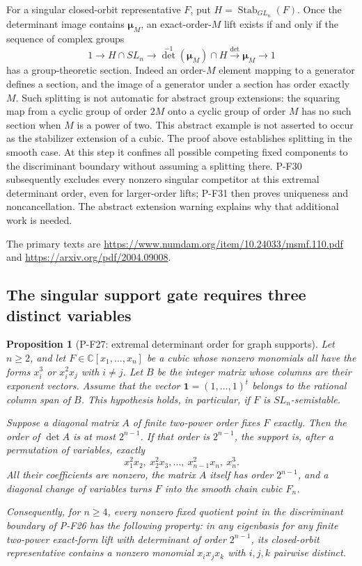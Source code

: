 \documentclass[11pt,a4paper]{article}
\newtheorem{proposition}{Proposition}[section]
\begin{document}
For a singular closed-orbit representative $F$, put
$H=\operatorname{Stab}_{GL_n}(F)$. Once the determinant image
contains $\boldsymbol\mu_M$, an exact-order-$M$ lift exists
if and only if the sequence of complex groups
\[
 1\longrightarrow H\cap SL_n\longrightarrow
   \det^{-1}(\boldsymbol\mu_M)\cap H
   \xrightarrow{\det}\boldsymbol\mu_M\longrightarrow1
 \tag{P-F26g}
\]
has a group-theoretic section. Indeed an order-$M$ element
mapping to a generator defines a section, and the image
of a generator under a section has order exactly $M$.
Such splitting is not automatic for abstract group extensions:
the squaring map from a cyclic group of order $2M$ onto a
cyclic group of order $M$ has no such section when $M$ is a
power of two. This abstract example is not asserted to occur
as the stabilizer extension of a cubic. The proof above
establishes splitting in the smooth case. At this step it
confines all possible competing fixed components to the
discriminant boundary without assuming a splitting there.
P-F30 subsequently excludes every nonzero singular competitor
at this extremal determinant order, even for larger-order lifts;
P-F31 then proves uniqueness and noncancellation. The abstract
extension warning explains why that additional work is needed.

The primary texts are
\url{https://www.numdam.org/item/10.24033/msmf.110.pdf}
and \url{https://arxiv.org/pdf/2004.09008}.


\subsection{The singular support gate requires three distinct variables}

\begin{proposition}[P-F27: extremal determinant order for graph supports]
\label{prop:cubicgraphsupport}
Let $n\ge2$, and let $F\in\mathbb C[x_1,\ldots,x_n]$ be a
cubic whose nonzero monomials all have the forms $x_i^3$ or
$x_i^2x_j$ with $i\ne j$. Let $B$ be the integer matrix whose
columns are their exponent vectors. Assume that the vector
$\mathbf1=(1,\ldots,1)^t$ belongs to the rational column span
of $B$. This hypothesis holds, in particular, if $F$ is
$SL_n$-semistable.

Suppose a diagonal matrix $A$ of finite two-power order fixes
$F$ exactly. Then the order of $\det A$ is at most $2^{n-1}$.
If that order is $2^{n-1}$, the support is, after a permutation
of variables, exactly
\[
 x_1^2x_2,\ x_2^2x_3,\ldots,\ x_{n-1}^2x_n,\ x_n^3.
 \tag{P-F27a}
\]
All their coefficients are nonzero, the matrix $A$ itself has
order $2^{n-1}$, and a diagonal change of variables turns $F$
into the smooth chain cubic $F_n$.

Consequently, for $n\ge4$, every nonzero fixed quotient point
in the discriminant boundary of P-F26 has the following
property: in any eigenbasis for any finite two-power
exact-form lift with determinant of order $2^{n-1}$, its
closed-orbit representative contains a nonzero monomial
$x_ix_jx_k$ with $i,j,k$ pairwise distinct.
\end{proposition}
\end{document}

